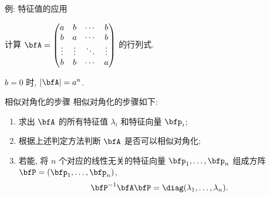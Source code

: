 \begin{frame}{例: 特征值的应用\noexer}
	\onslide<+->
	\begin{example}
		计算 $\bfA=\begin{pmatrix}
			a&b&\cdots&b\\
			b&a&\cdots&b\\
			\vdots&\vdots&\ddots&\vdots\\
			b&b&\cdots&a
		\end{pmatrix}$ 的行列式.
	\end{example}
	\onslide<+->
	\begin{solution}
		$b=0$ 时, $|\bfA|=a^n$.
		\onslide<+->{%
			\[|\bfA|=\bigl(nb-(b-a)\bigr)(a-b)^{n-1}=(a-b)^{n-1}(nb-b+a).\]
			\vspace{-\baselineskip}
		}
	\end{solution}
\end{frame}


\begin{frame}{相似对角化的步骤}
	\onslide<+->
	相似对角化的步骤如下:
	\begin{enumerate}
		\item 求出 $\bfA$ 的所有特征值 $\lambda_i$ 和特征向量 $\bfp_i$;
		\item 根据上述判定方法判断 $\bfA$ 是否可以相似对角化;
		\item 若能, 将 $n$ 个对应的线性无关的特征向量 $\bfp_1,\dots,\bfp_n$ 组成方阵 $\bfP=(\bfp_1,\dots,\bfp_n)$, 
		\[\bfP^{-1}\bfA\bfP=\diag(\lambda_1,\dots,\lambda_n).\]
	\end{enumerate}
\end{frame}


